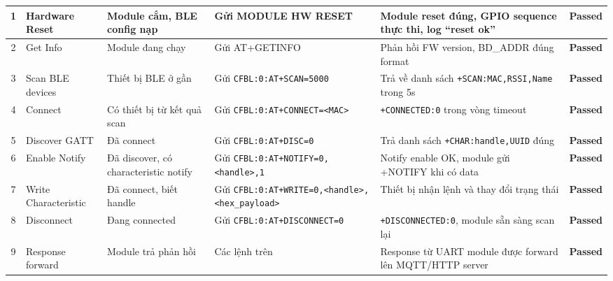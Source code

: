 \begin{longtable}{|c|p{2cm}|p{2.5cm}|p{3.5cm}|p{4cm}|c|}
            1 & Hardware Reset & Module cắm, BLE config nạp & Gửi MODULE HW RESET & Module reset đúng, GPIO sequence thực thi, log ``reset ok'' & \textcolor{modern_blue}{\textbf{Passed}} \\ \hline
            2 & Get Info & Module đang chạy & Gửi AT+GETINFO & Phản hồi FW version, BD\_ADDR đúng format & \textcolor{modern_blue}{\textbf{Passed}} \\ \hline
            3 & Scan BLE devices & Thiết bị BLE ở gần & Gửi \texttt{CFBL:0:}\newline\texttt{AT+SCAN=5000} & Trả về danh sách \texttt{+SCAN:MAC,RSSI,}\newline\texttt{Name} trong 5s & \textcolor{modern_blue}{\textbf{Passed}} \\ \hline
            4 & Connect & Có thiết bị từ kết quả scan & Gửi \texttt{CFBL:0:}\newline\texttt{AT+CONNECT=}\newline\texttt{<MAC>} & \texttt{+CONNECTED:0} trong vòng timeout & \textcolor{modern_blue}{\textbf{Passed}} \\ \hline
            5 & Discover GATT & Đã connect & Gửi \texttt{CFBL:0:}\newline\texttt{AT+DISC=0} & Trả danh sách \texttt{+CHAR:}\newline\texttt{handle,UUID} đúng & \textcolor{modern_blue}{\textbf{Passed}} \\ \hline
            6 & Enable Notify & Đã discover, có characteristic notify & Gửi \texttt{CFBL:0:}\newline\texttt{AT+NOTIFY=0,}\newline\texttt{<handle>,1} & Notify enable OK, module gửi +NOTIFY khi có data & \textcolor{modern_blue}{\textbf{Passed}} \\ \hline
            7 & Write Characteristic & Đã connect, biết handle & Gửi \texttt{CFBL:0:}\newline\texttt{AT+WRITE=0,}\newline\texttt{<handle>,}\newline\texttt{<hex\_payload>} & Thiết bị nhận lệnh và thay đổi trạng thái & \textcolor{modern_blue}{\textbf{Passed}} \\ \hline
            8 & Disconnect & Đang connected & Gửi \texttt{CFBL:0:}\newline\texttt{AT+DISCONNECT=0} & \texttt{+DISCONNECTED:0}, module sẵn sàng scan lại & \textcolor{modern_blue}{\textbf{Passed}} \\ \hline
            9 & Response forward & Module trả phản hồi & Các lệnh trên & Response từ UART module được forward lên MQTT/HTTP server & \textcolor{modern_blue}{\textbf{Passed}} \\ \hline
        \end{longtable}

